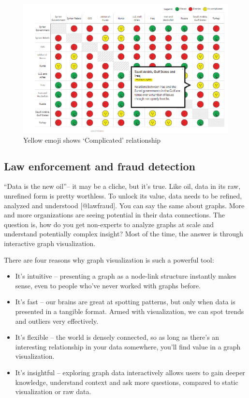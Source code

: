 \documentclass[]{book}
\providecommand{\tightlist}{%
  \setlength{\itemsep}{0pt}\setlength{\parskip}{0pt}}
\theoremstyle{definition}
\theoremstyle{definition}
\theoremstyle{definition}
\theoremstyle{remark}
\begin{document}
\begin{figure}
\centering
\includegraphics{images/img_syria_complicated.PNG}
\caption{Yellow emoji shows `Complicated' relationship}
\end{figure}

\subsection{Law enforcement and fraud
detection}\label{law-enforcement-and-fraud-detection}

``Data is the new oil''-- it may be a cliche, but it's true. Like oil,
data in its raw, unrefined form is pretty worthless. To unlock its
value, data needs to be refined, analyzed and understood
{[}@lawfraud{]}. You can say the same about graphs. More and more
organizations are seeing potential in their data connections. The
question is, how do you get non-experts to analyze graphs at scale and
understand potentially complex insight? Most of the time, the answer is
through interactive graph visualization.

There are four reasons why graph visualization is such a powerful tool:

\begin{itemize}
\tightlist
\item
  It's intuitive -- presenting a graph as a node-link structure
  instantly makes sense, even to people who've never worked with graphs
  before.
\item
  It's fast -- our brains are great at spotting patterns, but only when
  data is presented in a tangible format. Armed with visualization, we
  can spot trends and outliers very effectively.
\item
  It's flexible -- the world is densely connected, so as long as there's
  an interesting relationship in your data somewhere, you'll find value
  in a graph visualization.
\item
  It's insightful -- exploring graph data interactively allows users to
  gain deeper knowledge, understand context and ask more questions,
  compared to static visualization or raw data.
\end{itemize}
\end{document}

